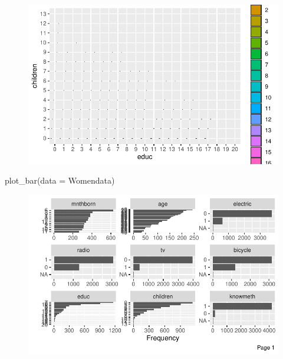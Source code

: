 \documentclass[
  letterpaper,
  DIV=11,
  numbers=noendperiod]{scrartcl}
\newenvironment{Shaded}{\begin{snugshade}}{\end{snugshade}}
\newcommand{\AttributeTok}[1]{\textcolor[rgb]{0.40,0.45,0.13}{#1}}
\newcommand{\FunctionTok}[1]{\textcolor[rgb]{0.28,0.35,0.67}{#1}}
\newcommand{\NormalTok}[1]{\textcolor[rgb]{0.00,0.23,0.31}{#1}}
\begin{document}
\begin{figure}[H]

{\centering \includegraphics{Fertility_Rates_Education_Impact_Botswana_files/figure-pdf/unnamed-chunk-29-1.pdf}

}

\end{figure}

\begin{Shaded}
\begin{Highlighting}[]
\FunctionTok{plot\_bar}\NormalTok{(}\AttributeTok{data =}\NormalTok{ Womendata)}
\end{Highlighting}
\end{Shaded}

\begin{figure}[H]

{\centering \includegraphics{Fertility_Rates_Education_Impact_Botswana_files/figure-pdf/unnamed-chunk-30-1.pdf}

}

\end{figure}
\end{document}
